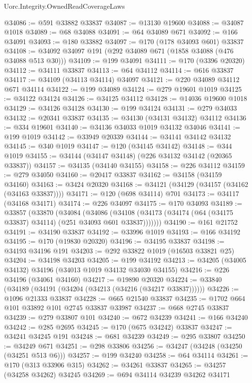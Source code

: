 \begin{lexlean}{Uorc.Integrity.OwnedReadCoverageLaws}
\begin{coremodule}
@34086 := @591 @33882 @33837
@34087 := @13130 @19600
@34088 := @34087 @1018
@34089 := @68 @34088
@34091 := @64 @34089 @671
@34092 := @166 @34091
@34093 := @180 @33882
@34097 := @170 (@178 @34093 @601) @33837
@34108 := @34092 @34097 @191 (@292 @34089 @671 (@1858 @34088 (@476 @34088 @513 @30)))
@34109 := @199 @34091
@34111 := @170 (@3396 @20320)
@34112 := @34111 @33837
@34113 := @64 @34112
@34114 := @616 @33837
@34117 := @34109 (@34113 @34114) @34097
@34121 := @220 @34089 @34112 @671 @34114
@34122 := @199 @34089
@34124 := @279 @19601 @1019
@34125 := @34122 @34124
@34126 := @34125 @34112
@34128 := @14036 @19600 @1018
@34129 := @34126 @34128
@34130 := @199 @34124
@34131 := @279 @34033
@34132 := @20341 @33837
@34135 := @34130 (@34131 @34132) @34112
@34136 := @334 @19601
@34140 := @34136 @34033 @1019 @34132 @34046
@34141 := @199 @1019
@34142 := @33949 @20339
@34144 := @34141 @34142 @34132
@34145 := @340 @1019
@34147 := @120 (@34145 @34142)
@34148 := @344 @1019
@34155 := @34144 (@34147 @34148) (@226 @34132 @34142 (@20365 @33837))
@34157 := @34135 (@34140 @34155)
@34158 := @226 @34112
@34159 := @279 @34050
@34160 := @20417 @33837
@34162 := @34158 (@34159 @34160)
@34163 := @3424 @20320
@34168 := @34121 (@34129 (@34157 (@34162 (@34163 @33837))))
@34171 := @120 (@698 @34114) @701
@34173 := @34117 (@34168 @34171)
@34174 := @226 @34097
@34175 := @170 @34093
@34189 := @33857
    (@33870
      (@34084
        (@34086 (@34108 (@34173 (@34174 (@64 (@34175 @33837) @34114) (@251 @34093 @601 @33837)))))))
@34190 := @161 @21752
@34191 := @34190 @33837
@34192 := @33996 @1019
@34193 := @166 @34192
@34195 := @170 (@19830 @20320)
@34196 := @34195 @33837
@34198 := @34193 @34196 @191
@34203 := @292 @33822 @1019 (@16503 @33821 @25)
@34204 := @34198 @34203
@34205 := @199 @34192
@34213 := @34205 (@34005 @34132) @34196 (@34013 @1019 @34132 @34030 @34155)
@34216 := @226 @34196 (@34061 @34160)
@34217 := @19890 @20320
@34224 := @33840 (@34189 (@34191 (@34204 (@34213 (@34216 (@34217 @33837))))))
@34226 := @1096 @21333 @33837
@34228 := @665 @21540 @33837
@34235 := @1702 @664 @101 @33892 @101 @2745 @33837 @33987
@34237 := @668 @2745 @33837
@34239 := @279 @33807 @101
@34240 := @672 @34239
@34241 := @166 @34240
@34242 := @285 @2695
@34245 := @170 (@675 @34242) @33837
@34247 := @34241 @34245 @191
@34248 := @681 @34239
@34249 := @295 @33807
@34250 := @34249 @671
@34251 := @298 @33806
@34256 := @34247 (@34248 (@34250 (@34251 @513 @6)))
@34257 := @199 @34240
@34258 := @64 @34114
@34261 := @170 (@313 @33906 @315)
@34262 := @34261 @33837
@34265 := @34257 (@34258 @34262) @34245
@34269 := @694 @34114 @34239 @34262 @34171

\end{coremodule}
\end{lexlean}
